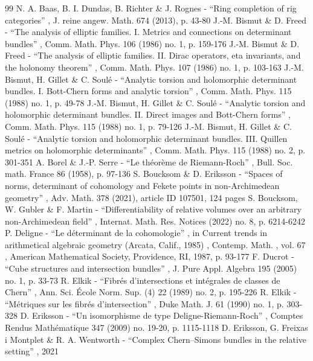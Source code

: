 \documentclass[11pt]{article}
\theoremstyle{plain}
\theoremstyle{definition}
\begin{document}

\begin{thebibliography}{99}
 N. A. Baas, B. I. Dundas, B. Richter \& J. Rognes - “Ring completion of rig categories” , J. reine angew. Math. 674 (2013), p. 43-80
 J.-M. Bismut \& D. Freed - “The analysis of elliptic families. I. Metrics and connections on determinant bundles” , Comm. Math. Phys. 106 (1986) no. 1, p. 159-176
 J.-M. Bismut \& D. Freed - “The analysis of elliptic families. II. Dirac operators, eta invariants, and the holonomy theorem” , Comm. Math. Phys. 107 (1986) no. 1, p. 103-163
 J.-M. Bismut, H. Gillet \& C. Soulé - “Analytic torsion and holomorphic determinant bundles. I. Bott-Chern forms and analytic torsion” , Comm. Math. Phys. 115 (1988) no. 1, p. 49-78
 J.-M. Bismut, H. Gillet \& C. Soulé - “Analytic torsion and holomorphic determinant bundles. II. Direct images and Bott-Chern forms” , Comm. Math. Phys. 115 (1988) no. 1, p. 79-126
 J.-M. Bismut, H. Gillet \& C. Soulé - “Analytic torsion and holomorphic determinant bundles. III. Quillen metrics on holomorphic determinants” , Comm. Math. Phys. 115 (1988) no. 2, p. 301-351
 A. Borel \& J.-P. Serre - “Le théorème de Riemann-Roch” , Bull. Soc. math. France 86 (1958), p. 97-136
 S. Boucksom \& D. Eriksson - “Spaces of norms, determinant of cohomology and Fekete points in non-Archimedean geometry” , Adv. Math. 378 (2021), article ID 107501, 124 pages
 S. Boucksom, W. Gubler \& F. Martin - “Differentiability of relative volumes over an arbitrary non-Archimedean field” , Internat. Math. Res. Notices (2022) no. 8, p. 6214-6242
 P. Deligne - “Le déterminant de la cohomologie” , in Current trends in arithmetical algebraic geometry (Arcata, Calif., 1985) , Contemp. Math. , vol. 67 , American Mathematical Society, Providence, RI, 1987, p. 93-177
 F. Ducrot - “Cube structures and intersection bundles” , J. Pure Appl. Algebra 195 (2005) no. 1, p. 33-73
 R. Elkik - “Fibrés d’intersections et intégrales de classes de Chern” , Ann. Sci. École Norm. Sup. (4) 22 (1989) no. 2, p. 195-226
 R. Elkik - “Métriques sur les fibrés d’intersection” , Duke Math. J. 61 (1990) no. 1, p. 303-328
 D. Eriksson - “Un isomorphisme de type Deligne-Riemann-Roch” , Comptes Rendus Mathématique 347 (2009) no. 19-20, p. 1115-1118
 D. Eriksson, G. Freixas i Montplet \& R. A. Wentworth - “Complex Chern–Simons bundles in the relative setting” , 2021

\end{thebibliography}
\end{document}
